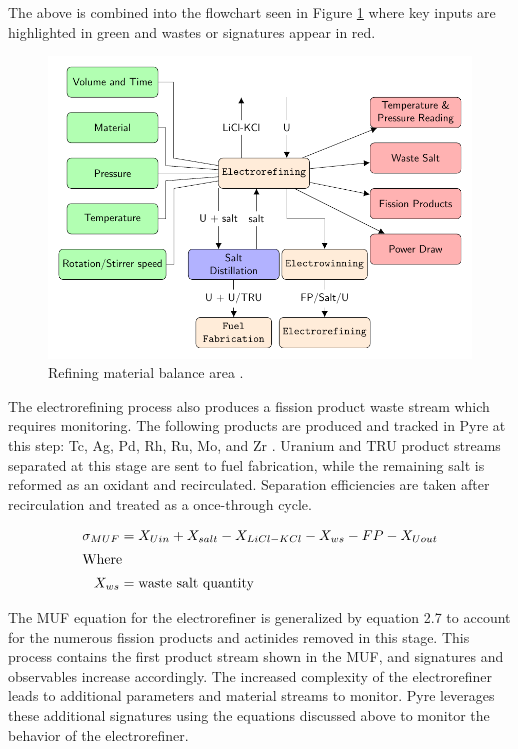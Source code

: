The above is combined into the flowchart seen in Figure \ref{fig:refining} where key inputs are highlighted in green and wastes or signatures appear in red. 

\begin{figure}[h]
	\centering
	\includegraphics[width=0.85\linewidth]{images/refining}
	\caption{Refining material balance area \cite{lee_advanced_2008}.}
	\label{fig:refining}
\end{figure}

The electrorefining process also produces a fission product waste stream which requires monitoring. 
The following products are produced and tracked in Pyre at this step: Tc, Ag, Pd, Rh, Ru, Mo, and Zr \cite{flowsheet_1998}. 
Uranium and \gls{TRU} product streams separated at this stage are sent to fuel fabrication, while the remaining salt is reformed as an oxidant and recirculated.
Separation efficiencies are taken after recirculation and treated as a once-through cycle. 

\begin{align}
\sigma_{MUF} &= X_{U in} + X_{salt} - X_{LiCl-KCl} - X_{ws} - FP - X_{U out} \\
\intertext{Where}
X_{ws} &= \mbox{waste salt quantity} \nonumber
\end{align}

The MUF equation for the electrorefiner is generalized by equation 2.7 to account for the numerous fission products and actinides removed in this stage. This process contains the first product stream shown in the MUF, and signatures and observables increase accordingly. The increased complexity of the electrorefiner leads to additional parameters and material streams to monitor. Pyre leverages these additional signatures using the equations discussed above to monitor the behavior of the electrorefiner.

